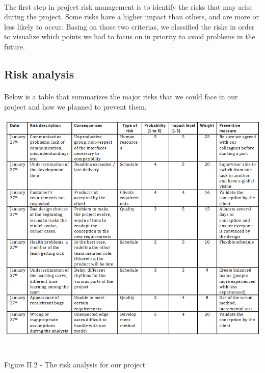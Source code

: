 \documentclass{report}
\begin{document}
\paragraph{}
\hspace{4mm}The first step in project risk management is to identify the risks
 that may arise during the project. Some risks have a higher impact than others, 
and are more or less likely to occur. Basing on those two criterias, we classified the risks
in order to visualize which points we had to focus on in priority to avoid problems in the future.

\subsection{Risk analysis}

\paragraph{}
\hspace{4mm}Below is a table that summarizes the major risks that we could face in our project and how we planned to prevent them.

\begin{center}
\includegraphics[scale=1.0]{data/RiskManagement.png}
~\\~\\Figure II.2 - The risk analysis for our project
\end{center}
\end{document}
